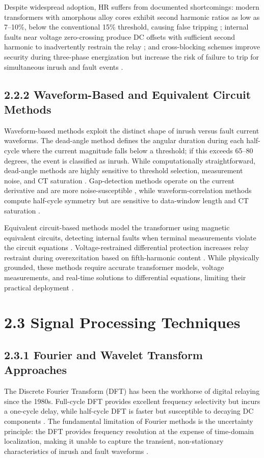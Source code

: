 Despite widespread adoption, HR suffers from documented shortcomings: modern transformers with amorphous alloy cores exhibit second harmonic ratios as low as 7--10\%, below the conventional 15\% threshold, causing false tripping \cite{ref11}; internal faults near voltage zero-crossing produce DC offsets with sufficient second harmonic to inadvertently restrain the relay \cite{ref8}; and cross-blocking schemes improve security during three-phase energization but increase the risk of failure to trip for simultaneous inrush and fault events \cite{ref25}.


\subsection{2.2.2  Waveform-Based and Equivalent Circuit Methods}
Waveform-based methods exploit the distinct shape of inrush versus fault current waveforms. The dead-angle method defines the angular duration during each half-cycle where the current magnitude falls below a threshold; if this exceeds 65--80 degrees, the event is classified as inrush. While computationally straightforward, dead-angle methods are highly sensitive to threshold selection, measurement noise, and CT saturation \cite{ref26}. Gap-detection methods operate on the current derivative and are more noise-susceptible \cite{ref27}, while waveform-correlation methods compute half-cycle symmetry but are sensitive to data-window length and CT saturation \cite{ref28}.

Equivalent circuit-based methods model the transformer using magnetic equivalent circuits, detecting internal faults when terminal measurements violate the circuit equations \cite{ref29}. Voltage-restrained differential protection increases relay restraint during overexcitation based on fifth-harmonic content \cite{ref29}. While physically grounded, these methods require accurate transformer models, voltage measurements, and real-time solutions to differential equations, limiting their practical deployment \cite{ref30}.


\section{2.3  Signal Processing Techniques}

\subsection{2.3.1  Fourier and Wavelet Transform Approaches}
The Discrete Fourier Transform (DFT) has been the workhorse of digital relaying since the 1980s. Full-cycle DFT provides excellent frequency selectivity but incurs a one-cycle delay, while half-cycle DFT is faster but susceptible to decaying DC components \cite{ref31}. The fundamental limitation of Fourier methods is the uncertainty principle: the DFT provides frequency resolution at the expense of time-domain localization, making it unable to capture the transient, non-stationary characteristics of inrush and fault waveforms \cite{ref32}.

